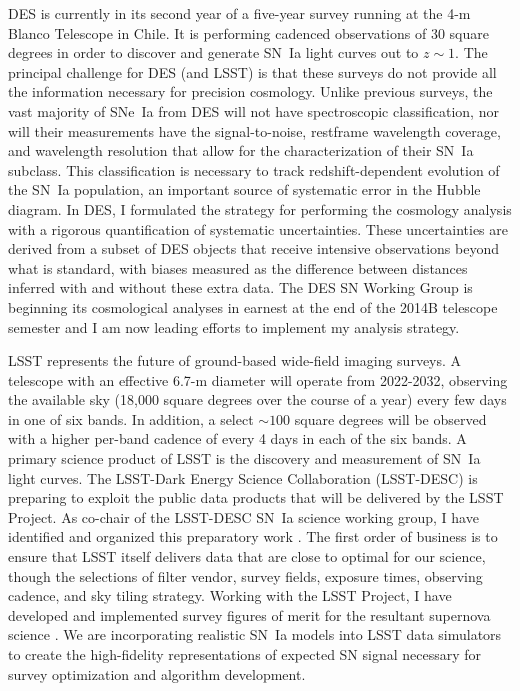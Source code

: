 \documentclass[12pt]{article}
\begin{document}
DES is currently in its second year of a five-year survey running at the 4-m Blanco Telescope in Chile.  It is performing
cadenced observations of 30 square degrees in order to discover and generate SN~Ia light curves out
to $z\sim1$.
The principal challenge for DES (and LSST) is that these surveys do
not provide all the information necessary for precision cosmology.
Unlike previous surveys, the vast majority of SNe~Ia from DES
will not have spectroscopic classification, nor will their
measurements have the signal-to-noise, restframe wavelength coverage, and wavelength resolution that allow  for
the characterization of their SN~Ia subclass.  This classification is necessary to track redshift-dependent evolution of 
the SN~Ia population, an important source of systematic error in the Hubble diagram.  In DES, I  formulated the strategy for performing the cosmology analysis
with a rigorous quantification of systematic uncertainties.  These uncertainties are  derived from a subset of 
DES objects that receive intensive observations beyond what is standard, with
biases measured as the difference between distances inferred with
and without these extra data. 
The DES SN Working Group is beginning its cosmological analyses in earnest at the end
of the 2014B telescope semester and I am now leading efforts to implement my analysis strategy.

LSST  represents the future of ground-based wide-field imaging surveys.
A telescope with an effective 6.7-m diameter will operate from 2022-2032, observing the available sky (18,000 square degrees over the course
of a year)
every few days in one of six bands.  In addition, a select $\sim 100$ square degrees will be observed with a higher per-band
cadence of every 4 days
in each of the six bands.
A primary science product of LSST is the discovery and measurement of SN~Ia light curves.
The LSST-Dark Energy Science Collaboration (LSST-DESC) is preparing
to exploit  the public data products that will be
delivered by the  LSST Project.  As co-chair of the LSST-DESC  SN~Ia science working group,
 I have identified and organized this preparatory work \cite{2012arXiv1211.0310L}.
The first order of business is to ensure that LSST itself delivers data that are  close to optimal for our science, though
the selections of filter vendor, survey fields, exposure times, observing cadence, and sky tiling strategy.
Working with the LSST Project\iftoggle{UW}{ (including UW colleagues)}{},
I have developed and implemented survey figures of merit for the resultant supernova science
\cite{LSSTCadence}.  
We are incorporating realistic SN~Ia models  into LSST  data simulators to create the high-fidelity representations
of expected SN signal necessary for survey optimization and algorithm development.
\iftoggle{UW}{Progress on this ongoing work will be
facilitated by my being co-located with key players in the LSST Project.}{}
\end{document}
